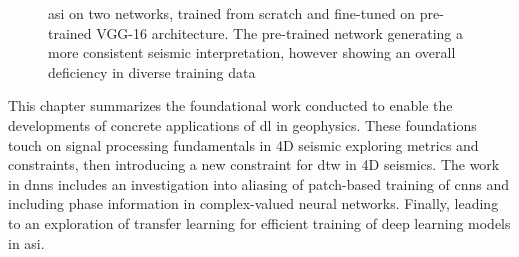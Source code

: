 \begin{figure}[!ht]
\caption{\acl{asi} on two networks, trained from scratch and fine-tuned on pre-trained VGG-16 architecture. The pre-trained network generating a more consistent seismic interpretation, however showing an overall deficiency in diverse training data \citep[from][]{dramsch2018deep}}
\label{fig:asi}
\end{figure}

This chapter summarizes the foundational work conducted to enable the developments of concrete applications of \acl{dl} in geophysics. These foundations touch on signal processing fundamentals in 4D seismic exploring metrics and constraints, then introducing a new constraint for \acl{dtw} in 4D seismics. The work in \aclp{dnn} includes an investigation into aliasing of patch-based training of \aclp{cnn} and including phase information in complex-valued neural networks. Finally, leading to an exploration of transfer learning for efficient training of deep learning models in \acl{asi}.